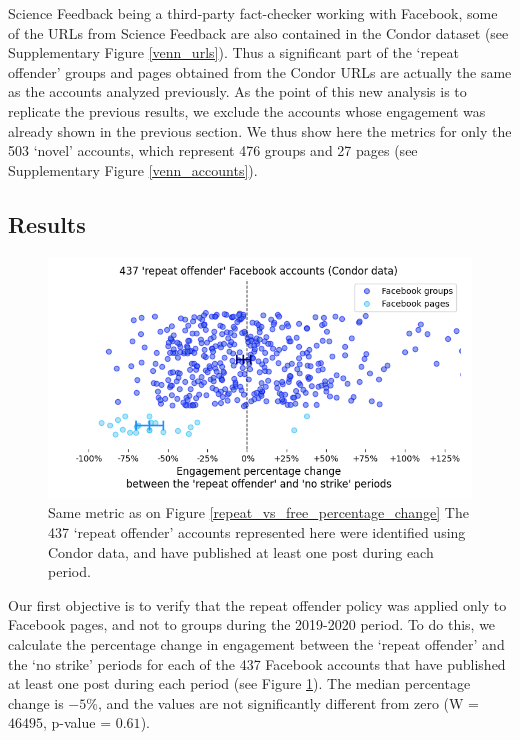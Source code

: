 \documentclass[review]{elsarticle}
\begin{document}
Science Feedback being a third-party fact-checker working with Facebook, some of the URLs from Science Feedback are also contained in the Condor dataset (see Supplementary Figure \ref{venn_urls}). 
Thus a significant part of the `repeat offender' groups and pages obtained from the Condor URLs are actually the same as the accounts analyzed previously. 
As the point of this new analysis is to replicate the previous results, we exclude the accounts whose engagement was already shown in the previous section. 
We thus show here the metrics for only the 503 `novel' accounts, which represent 476 groups and 27 pages (see Supplementary Figure \ref{venn_accounts}).

\subsection{Results}

\begin{figure}[!h]
\centering
\includegraphics[scale=0.5]{./../figure/condor_repeat_vs_free_percentage_change.png}
\caption{
Same metric as on Figure \ref{repeat_vs_free_percentage_change}
The 437 `repeat offender' accounts represented here were identified using Condor data, and have published at least one post during each period.
}
\label{condor_repeat_vs_free_percentage_change}
\end{figure}

Our first objective is to verify that the repeat offender policy was applied only to Facebook pages, and not to groups during the 2019-2020 period.
To do this, we calculate the percentage change in engagement between the `repeat offender' and the `no strike' periods for each of the 437 Facebook accounts that have published at least one post during each period (see Figure \ref{condor_repeat_vs_free_percentage_change}). 
The median percentage change is $-5\%$, and the values are not significantly different from zero (W = $46495$, p-value = $0.61$).
\end{document}
